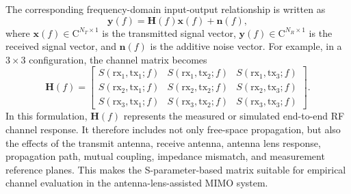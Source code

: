 The corresponding frequency-domain input-output relationship is written as
\begin{equation}
    \mathbf{y}(f) = \mathbf{H}(f)\mathbf{x}(f) + \mathbf{n}(f),
\end{equation}
where $\mathbf{x}(f)\in\mathrm{C}^{N_T \times 1}$ is the transmitted signal vector, $\mathbf{y}(f)\in\mathrm{C}^{N_R \times 1}$ is the received signal vector, and $\mathbf{n}(f)$ is the additive noise vector. For example, in a $3\times3$ configuration, the channel matrix becomes
\begin{equation}
    \mathbf{H}(f) =
    \begin{bmatrix}
        S(\mathrm{rx}_1,\mathrm{tx}_1;f) & S(\mathrm{rx}_1,\mathrm{tx}_2;f) & S(\mathrm{rx}_1,\mathrm{tx}_3;f) \\
        S(\mathrm{rx}_2,\mathrm{tx}_1;f) & S(\mathrm{rx}_2,\mathrm{tx}_2;f) & S(\mathrm{rx}_2,\mathrm{tx}_3;f) \\
        S(\mathrm{rx}_3,\mathrm{tx}_1;f) & S(\mathrm{rx}_3,\mathrm{tx}_2;f) & S(\mathrm{rx}_3,\mathrm{tx}_3;f)
    \end{bmatrix}.
\end{equation}
In this formulation, $\mathbf{H}(f)$ represents the measured or simulated end-to-end RF channel response. It therefore includes not only free-space propagation, but also the effects of the transmit antenna, receive antenna, antenna lens response, propagation path, mutual coupling, impedance mismatch, and measurement reference planes. This makes the S-parameter-based matrix suitable for empirical channel evaluation in the antenna-lens-assisted MIMO system.

